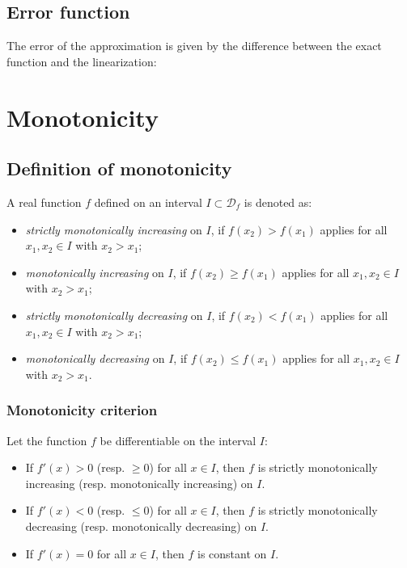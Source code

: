 \documentclass{article}
\begin{document}
\subsection{Error function}
The error of the approximation is given by the difference between
the exact function and the linearization:

\section{Monotonicity}
\subsection{Definition of monotonicity}
A real function $f$ defined on an interval $I \subset \mathcal{D}_f$ is denoted as:
\begin{itemize}
    \item \textit{strictly monotonically increasing} on $I$, if $f(x_2) > f(x_1)$ applies for all $x_1, x_2 \in I$ with $x_2 > x_1$;
    \item \textit{monotonically increasing} on $I$, if $f(x_2) \geq f(x_1)$ applies for all $x_1, x_2 \in I$ with $x_2 > x_1$;
    \item \textit{strictly monotonically decreasing} on $I$, if $f(x_2) < f(x_1)$ applies for all $x_1, x_2 \in I$ with $x_2 > x_1$;
    \item \textit{monotonically decreasing} on $I$, if $f(x_2) \leq f(x_1)$ applies for all $x_1, x_2 \in I$ with $x_2 > x_1$.
\end{itemize}

\subsubsection{Monotonicity criterion}
Let the function $f$ be differentiable on the interval $I$:
\begin{itemize}
    \item If $f'(x) > 0$ (resp. $\geq 0$) for all $x \in I$, then $f$ is strictly monotonically increasing (resp. monotonically increasing) on $I$.
    \item If $f'(x) < 0$ (resp. $\leq 0$) for all $x \in I$, then $f$ is strictly monotonically decreasing (resp. monotonically decreasing) on $I$.
    \item If $f'(x) = 0$ for all $x \in I$, then $f$ is constant on $I$.
\end{itemize}
\end{document}

